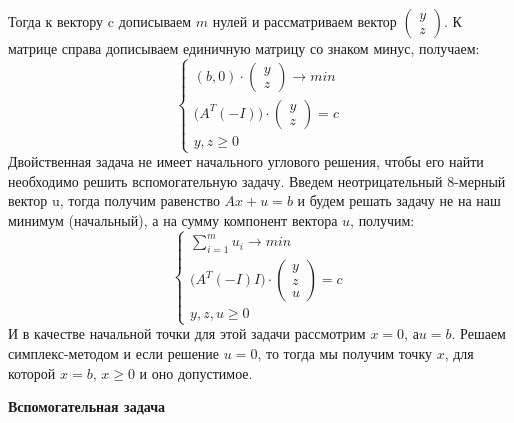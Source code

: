 \documentclass[a4paper, 14pt]{extarticle}
\begin{document}
 		Тогда к вектору c дописываем $m$ нулей и рассматриваем вектор
 		$\begin{pmatrix} y\\z \end{pmatrix}$. К матрице справа дописываем единичную матрицу со знаком минус, получаем:
 		\[
 			\begin{cases}
 				(b, 0) \cdot \begin{pmatrix} y\\z \end{pmatrix} \rightarrow min\\
 				\big(A^T(-I)\big) \cdot \begin{pmatrix} y\\z \end{pmatrix} = c\\
 				y, z \geq 0
			\end{cases}
 		\]
 		Двойственная задача не имеет начального углового решения, чтобы его найти необходимо решить вспомогательную задачу. Введем
 		неотрицательный 8-мерный вектор u, тогда получим равенство $Ax +
 		u = b$ и будем решать задачу не на наш минимум (начальный), а на
 		сумму компонент вектора $u$, получим:
 		\[
 			\begin{cases} 
				\sum_{i=1}^{m} u_i \rightarrow min\\
				\big( A^T(-I)I\big) \cdot \begin{pmatrix} y\\z\\u\end{pmatrix} = c\\
				y, z, u \geq 0
			\end{cases}
 		\]
 		И в качестве начальной точки для этой задачи рассмотрим $x = 0$,
 		$а u = b$. Решаем симплекс-методом и если решение $u = 0$, то тогда
 		мы получим точку $x$, для которой $x = b$, $x \geq 0$ и оно допустимое.
 		
 		\textbf{Вспомогательная задача}
 		
\end{document}
